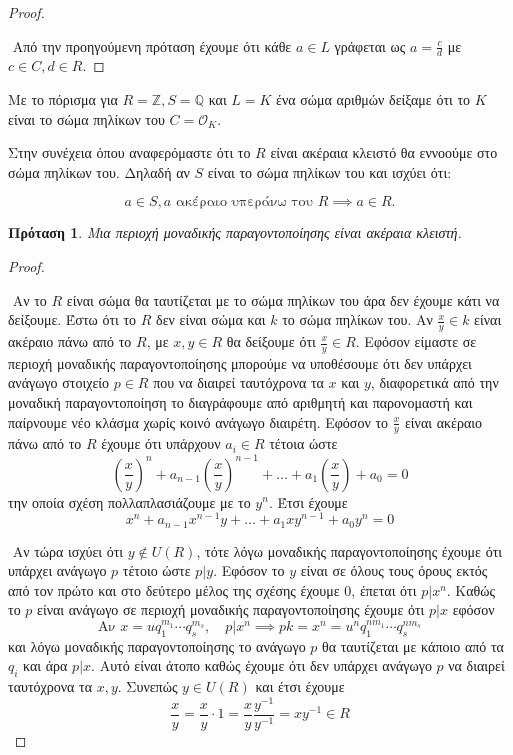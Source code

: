 \documentclass[oneside,a4paper]{article}
\newtheorem{prop}{Πρόταση}
\newcommand{\Z}{\mathbb{Z}}
\newcommand{\Q}{\mathbb{Q}}
\begin{document}
\begin{proof} $ $

	$ $\newline
	Από την προηγούμενη πρόταση έχουμε ότι κάθε $a \in L$ γράφεται ως $a = \frac{c}{d}$ με $c \in C, d \in R$. 

\end{proof}


\noindent Με το πόρισμα για $R = \Z, S=\Q$ και $L = K$ ένα σώμα αριθμών δείξαμε ότι το $K$ είναι το σώμα πηλίκων του $C = \mathcal{O}_K$.

\noindent Στην συνέχεια όπου αναφερόμαστε ότι το $R$ είναι ακέραια κλειστό θα εννοούμε στο σώμα πηλίκων του. Δηλαδή αν $S$ είναι το σώμα πηλίκων του και ισχύει ότι:

$$ a \in S, a \text{ ακέραιο υπεράνω του } R \implies a \in R.$$


\begin{prop}
	Μια περιοχή μοναδικής παραγοντοποίησης είναι ακέραια κλειστή.
\end{prop}

\begin{proof} $ $

	$ $\newline
	Αν το $R$ είναι σώμα θα ταυτίζεται με το σώμα πηλίκων του άρα δεν έχουμε κάτι να δείξουμε. Έστω ότι το $R$ δεν είναι σώμα και $k$ το σώμα πηλίκων του. Αν $\frac{x}{y} \in k$ είναι ακέραιο πάνω από το $R$, με $x,y \in R$ θα δείξουμε ότι $\frac{x}{y} \in R$. Εφόσον είμαστε σε περιοχή μοναδικής παραγοντοποίησης μπορούμε να υποθέσουμε ότι δεν υπάρχει ανάγωγο στοιχείο $p \in R$ που να διαιρεί ταυτόχρονα τα $x$ και $y$, διαφορετικά από την μοναδική παραγοντοποίηση το διαγράφουμε από αριθμητή και παρονομαστή και παίρνουμε νέο κλάσμα χωρίς κοινό ανάγωγο διαιρέτη. Εφόσον το $\frac{x}{y}$ είναι ακέραιο πάνω από το $R$ έχουμε ότι υπάρχουν $a_i \in R$ τέτοια ώστε 
	$$\left(\frac{x}{y}\right)^n + a_{n-1}\left(\frac{x}{y}\right)^{n-1} + \ldots + a_1\left(\frac{x}{y}\right) + a_0 = 0$$ την οποία σχέση πολλαπλασιάζουμε με το $y^n$. Έτσι έχουμε $$x^n + a_{n-1}x^{n-1}y + \ldots + a_1 x y^{n-1} + a_0 y^n = 0$$

	$ $\newline
	Αν τώρα ισχύει ότι $y \not\in U(R)$, τότε λόγω μοναδικής παραγοντοποίησης έχουμε ότι υπάρχει ανάγωγο $p$ τέτοιο ώστε $p | y$. Εφόσον το $y$ είναι σε όλους τους όρους εκτός από τον πρώτο και στο δεύτερο μέλος της σχέσης έχουμε 0, έπεται ότι $p | x^n$. Καθώς το $p$ είναι ανάγωγο σε περιοχή μοναδικής παραγοντοποίησης έχουμε ότι $p |x$ εφόσον
	$$\text{Αν } x = u q^{m_1}_1 \cdots q^{m_s}_s, \quad p|x^n \implies pk = x^n = u^n q^{nm_1}_1 \cdots q^{nm_s}_s$$ και λόγω μοναδικής παραγοντοποίησης το ανάγωγο $p$ θα ταυτίζεται με κάποιο από τα $q_i$ και άρα $p|x$. Αυτό είναι άτοπο καθώς έχουμε ότι δεν υπάρχει ανάγωγο $p$ να διαιρεί ταυτόχρονα τα $x,y$. Συνεπώς $y \in U(R)$ και έτσι έχουμε
	$$\frac{x}{y} = \frac{x}{y}\cdot 1 = \frac{x}{y} \frac{y^{-1}}{y^{-1}} = xy^{-1} \in R$$
\end{proof}
\end{document}
